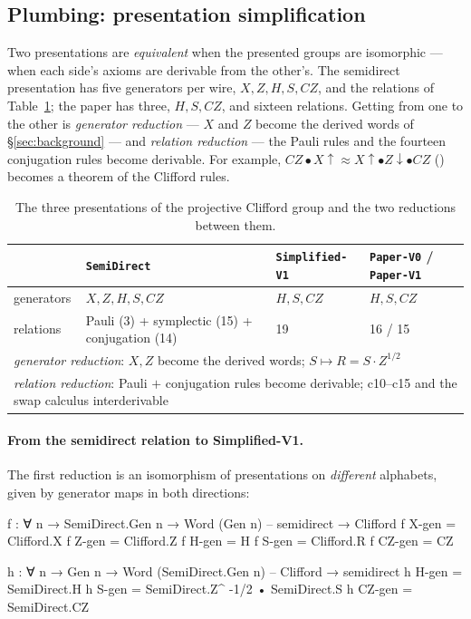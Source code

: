 \subsection{Plumbing: presentation simplification}\label{sec:plumbing}

Two presentations are \emph{equivalent} when the presented groups are
isomorphic --- when each side's axioms are derivable from the other's.
The semidirect presentation has five generators per wire, $X, Z, H, S,
CZ$, and the relations of Table~\ref{tab:plumb}; the paper has three,
$H, S, CZ$, and sixteen relations.  Getting from one to the other is
\emph{generator reduction} --- $X$ and $Z$ become the derived words of
\S\ref{sec:background} --- and \emph{relation reduction} --- the Pauli
rules and the fourteen conjugation rules become derivable.  For
example, $CZ \bullet X{\uparrow} \approx X{\uparrow} \bullet
Z{\downarrow} \bullet CZ$ () becomes a
theorem of the Clifford rules.

\begin{table}[h]
\caption{The three presentations of the projective Clifford group and
the two reductions between them.}
\label{tab:plumb}
\centering\footnotesize
\begin{tabular}{llll}
\toprule
 & \texttt{SemiDirect} & \texttt{Simplified-V1} & \texttt{Paper-V0} / \texttt{Paper-V1} \\
\midrule
generators & $X, Z, H, S, CZ$ & $H, S, CZ$ & $H, S, CZ$ \\
relations  & Pauli (3) + symplectic (15) + conjugation (14) & 19 & 16 / 15 \\
\midrule
\multicolumn{4}{l}{\emph{generator reduction}: $X, Z$ become the derived words; $S \mapsto R = S\cdot Z^{1/2}$}\\
\multicolumn{4}{l}{\emph{relation reduction}: Pauli $+$ conjugation rules become derivable; c10--c15 and the swap calculus interderivable}\\
\bottomrule
\end{tabular}
\end{table}

\paragraph{From the semidirect relation to Simplified-V1.}  The first
reduction is an isomorphism of presentations on \emph{different}
alphabets, given by generator maps in both directions:

\begin{agdacode}
f : ∀ {n} → SemiDirect.Gen n → Word (Gen n)      -- semidirect → Clifford
f X-gen  = Clifford.X
f Z-gen  = Clifford.Z
f H-gen  = H
f S-gen  = Clifford.R
f CZ-gen = CZ

h : ∀ {n} → Gen n → Word (SemiDirect.Gen n)      -- Clifford → semidirect
h H-gen  = SemiDirect.H
h S-gen  = SemiDirect.Z^ -1/2 • SemiDirect.S
h CZ-gen = SemiDirect.CZ
\end{agdacode}

